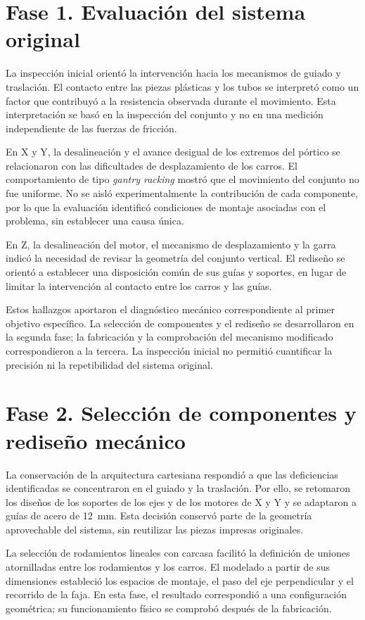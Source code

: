 \section{Fase 1. Evaluación del sistema original}

La inspección inicial orientó la intervención hacia los mecanismos de guiado y traslación. El contacto entre las piezas plásticas y los tubos se interpretó como un factor que contribuyó a la resistencia observada durante el movimiento. Esta interpretación se basó en la inspección del conjunto y no en una medición independiente de las fuerzas de fricción.

En X y Y, la desalineación y el avance desigual de los extremos del pórtico se relacionaron con las dificultades de desplazamiento de los carros. El comportamiento de tipo \textit{gantry racking} mostró que el movimiento del conjunto no fue uniforme. No se aisló experimentalmente la contribución de cada componente, por lo que la evaluación identificó condiciones de montaje asociadas con el problema, sin establecer una causa única.

En Z, la desalineación del motor, el mecanismo de desplazamiento y la garra indicó la necesidad de revisar la geometría del conjunto vertical. El rediseño se orientó a establecer una disposición común de sus guías y soportes, en lugar de limitar la intervención al contacto entre los carros y las guías.

Estos hallazgos aportaron el diagnóstico mecánico correspondiente al primer objetivo específico. La selección de componentes y el rediseño se desarrollaron en la segunda fase; la fabricación y la comprobación del mecanismo modificado correspondieron a la tercera. La inspección inicial no permitió cuantificar la precisión ni la repetibilidad del sistema original.

\section{Fase 2. Selección de componentes y rediseño mecánico}

La conservación de la arquitectura cartesiana respondió a que las deficiencias identificadas se concentraron en el guiado y la traslación. Por ello, se retomaron los diseños de los soportes de los ejes y de los motores de X y Y y se adaptaron a guías de acero de 12~mm. Esta decisión conservó parte de la geometría aprovechable del sistema, sin reutilizar las piezas impresas originales.

La selección de rodamientos lineales con carcasa facilitó la definición de uniones atornilladas entre los rodamientos y los carros. El modelado a partir de sus dimensiones estableció los espacios de montaje, el paso del eje perpendicular y el recorrido de la faja. En esta fase, el resultado correspondió a una configuración geométrica; su funcionamiento físico se comprobó después de la fabricación.


